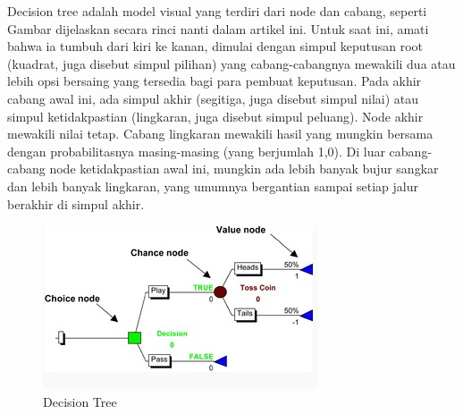 \par Decision tree adalah model visual yang terdiri dari node dan cabang, seperti Gambar dijelaskan secara rinci nanti dalam artikel ini. Untuk saat ini, amati bahwa ia tumbuh dari kiri ke kanan, dimulai dengan simpul keputusan root (kuadrat, juga disebut simpul pilihan) yang cabang-cabangnya mewakili dua atau lebih opsi bersaing yang tersedia bagi para pembuat keputusan. Pada akhir cabang awal ini, ada simpul akhir (segitiga, juga disebut simpul nilai) atau simpul ketidakpastian (lingkaran, juga disebut simpul peluang). Node akhir mewakili nilai tetap. Cabang lingkaran mewakili hasil yang mungkin bersama dengan probabilitasnya masing-masing (yang berjumlah 1,0). Di luar cabang-cabang node ketidakpastian awal ini, mungkin ada lebih banyak bujur sangkar dan lebih banyak lingkaran, yang umumnya bergantian sampai setiap jalur berakhir di simpul akhir.
\begin{figure}[ht]
\centering
\includegraphics[scale=0.5]{figures/f6.jpg}
\caption{Decision Tree}
\label{contoh}
\end{figure}

